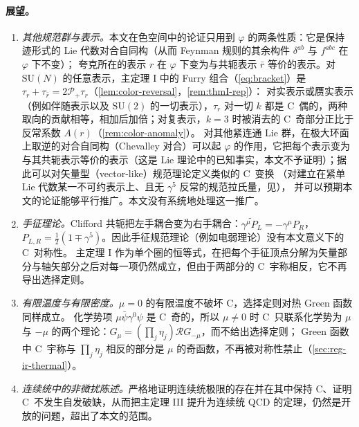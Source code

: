 \documentclass[UTF8,a4paper,11pt,fontset=fandol]{ctexart}
\theoremstyle{cplain}
\theoremstyle{cdefinition}
\theoremstyle{cremark}
\numberwithin{equation}{section}
\newcommand{\Rop}{\mathcal{R}}                       %
\newcommand{\Pp}{\mathcal{P}_{+}}                    %
\newcommand{\Cconj}[1]{\widetilde{#1}}              %
\begin{document}
\paragraph{展望。}
\begin{enumerate}[label=(\roman*),leftmargin=2em,itemsep=2pt,topsep=3pt,beginpenalty=10000]
\item \emph{其他规范群与表示。}本文在色空间中的论证只用到 $\varphi$ 的两条性质：它是保持迹形式的 Lie 代数对合自同构（从而 Feynman 规则的其余构件 $\delta^{ab}$ 与 $f^{abc}$ 在 $\varphi$ 下不变）；
夸克所在的表示 $r$ 在 $\varphi$ 下变为与共轭表示 $\bar r$ 等价的表示。对 $\mathrm{SU}(N)$ 的任意表示，主定理 I 中的 Furry 组合（\cref{eq:bracket}）是 $\tau_r+\tau_{\bar r}=2\Pp\tau_r$（\cref{lem:color-reversal}，\cref{rem:thmI-rep}）：
对实表示或赝实表示（例如伴随表示以及 $\mathrm{SU}(2)$ 的一切表示），$\tau_r$ 对一切 $k$ 都是 C~偶的，两种取向的贡献相等，相加后加倍；对复表示，$k=3$ 时被消去的 C~奇部分正比于反常系数 $A(r)$（\cref{rem:color-anomaly}）。
对其他紧连通 Lie 群，在极大环面上取逆的对合自同构（Chevalley 对合）可以起 $\varphi$ 的作用，它把每个表示变为与其共轭表示等价的表示（这是 Lie 理论中的已知事实，本文不予证明）；据此可以对矢量型（vector-like）规范理论定义类似的 C~变换
（对建立在紧单 Lie 代数某一不可约表示上、且无 $\gamma^5$ 反常的规范拉氏量，见\cite{Smolyakov1982}），
并可以预期本文的论证能够平行推广。本文没有系统地处理这一推广。
\item \emph{手征理论。}Clifford 共轭把左手耦合变为右手耦合：$\Cconj{\gamma^\mu P_L}=-\gamma^\mu P_R$，$P_{L,R}=\frac12(1\mp\gamma^5)$。因此手征规范理论（例如电弱理论）没有本文意义下的 C~对称性。
主定理 I 作为单个圈的恒等式，在把每个手征顶点分解为矢量部分与轴矢部分之后对每一项仍然成立，但由于两部分的 C~宇称相反，它不再导出选择定则。
\item \emph{有限温度与有限密度。}$\mu=0$ 的有限温度不破坏 C，选择定则对热 Green 函数同样成立。
化学势项 $\mu\bar\psi\gamma^0\psi$ 是 C~奇的，所以 $\mu\neq0$ 时 C~只联系化学势为 $\mu$ 与 $-\mu$ 的两个理论：$G_\mu=(\prod_j\eta_j)\Rop G_{-\mu}$，而不给出选择定则；
Green 函数中 C~宇称与 $\prod_j\eta_j$ 相反的部分是 $\mu$ 的奇函数，不再被对称性禁止（\cref{sec:reg-ir-thermal}）。
\item \emph{连续统中的非微扰陈述。}严格地证明连续统极限的存在并在其中保持 C、证明 C~不发生自发破缺，从而把主定理 III 提升为连续统 QCD 的定理，仍然是开放的问题，超出了本文的范围。
\end{enumerate}

\appendix
\end{document}

